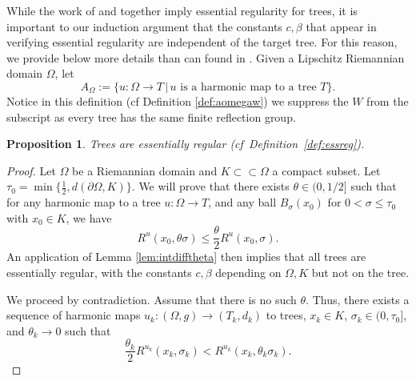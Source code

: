 \documentclass[12pt]{amsart}
\newtheorem{proposition}[theorem]{Proposition}
\theoremstyle{definition}
\numberwithin{equation}{section}
\begin{document}
While the work of \cite{sun} and \cite{gromov-schoen} together imply essential regularity for trees, it is important to our induction argument that the constants $c, \beta$ that appear in verifying essential regularity are independent of the target tree. For this reason, we provide below more details than can found in \cite[proof of Theorem 5.5]{gromov-schoen}. Given a Lipschitz Riemannian domain $\Omega$, let $$A_{\Omega}:=\{u:\Omega\to T\,|\, u \text{ is a harmonic map to a tree }T\}.$$
Notice in this definition (cf Definition \ref{def:aomegaw}) we suppress the $W$ from the subscript as every tree has the same finite reflection group.
\begin{proposition}\label{prop:tessreg}
Trees are essentially regular (cf~Definition~\ref{def:essreg}). 
\end{proposition}
\begin{proof}
Let $\Omega$ be a Riemannian domain and $K\subset\subset\Omega$ a compact subset.  Let $\tau_0=\min \{\frac 12, d(\partial\Omega,K)\}$.  We will prove that there exists $\theta \in (0, 1/2]$ such that for any harmonic map to a tree $u:\Omega\to T$, and any ball $B_\sigma(x_0)$ for $0<\sigma\leq\tau_0$ with $x_0\in K$, we have
\[
R^{u}(x_0,\theta\sigma)\leq\frac\theta2R^{u}(x_0,\sigma).
\]
An application of Lemma \ref{lem:intdifftheta} then implies that all trees are essentially regular, with the constants $c, \beta$ depending on $\Omega, K$ but not on the tree.

We proceed by contradiction.  Assume that there is no such $\theta$.  Thus, there exists  a sequence of harmonic maps $u_k:(\Omega,g)\to (T_k,d_k)$ to trees,  $x_k\in K$, $\sigma_k\in(0,\tau_0]$, and $\theta_k \to 0$ such that
\[
\frac{\theta_k}2R^{u_k}(x_k,\sigma_k) <R^{u_k}(x_k,\theta_k\sigma_k).
\]



\end{proof}
\end{document}
